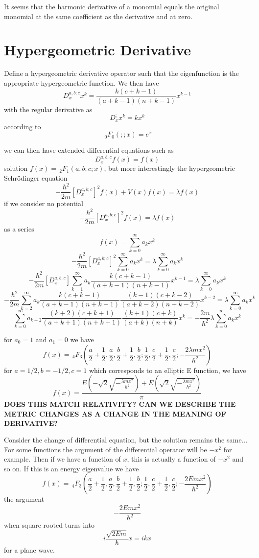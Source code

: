 \documentclass{article}
\begin{document}
It seems that the harmonic derivative of a monomial equals the original monomial at the same coefficient as the derivative and at zero.


\section{Hypergeometric Derivative}
Define a hypergeometric derivative operator such that the eigenfunction is the appropriate hypergeometric function. We then have 
$$
D^{a,b;c}_x x^k = \frac{k(c+k-1)}{(a+k-1)(n+k-1)}x^{k-1}
$$
with the regular derivative as 
$$
D^;_x x^k = k x^k
$$
according to 
$$
\;_0F_0(;;x) = e^x
$$

we can then have extended differential equations such as 
$$
D^{a,b;c}_x f(x) = f(x)
$$
solution $f(x) = \,_2F_1(a,b;c;x)$, but more interestingly the hypergeometric Schrödinger equation
$$
-\frac{\hbar^2}{2m} [D^{a,b;c}_x]^2 f(x) + V(x)f(x) = \lambda f(x)
$$
if we consider no potential
$$
-\frac{\hbar^2}{2m} [D^{a,b;c}_x]^2 f(x) = \lambda f(x)
$$
as a series 
$$
f(x) = \sum_{k=0}^\infty a_k x^k
$$
$$
-\frac{\hbar^2}{2m} [D^{a,b;c}_x]^2 \sum_{k=0}^\infty a_k x^k = \lambda \sum_{k=0}^\infty a_k x^k
$$
$$
-\frac{\hbar^2}{2m} [D^{a,b;c}_x]\sum_{k=1}^\infty a_k  \frac{k(c+k-1)}{(a+k-1)(n+k-1)} x^{k-1} = \lambda \sum_{k=0}^\infty a_k x^k
$$
$$
-\frac{\hbar^2}{2m}\sum_{k=2}^\infty a_k  \frac{k(c+k-1)}{(a+k-1)(n+k-1)} \frac{(k-1)(c+k-2)}{(a+k-2)(n+k-2)} x^{k-2} = \lambda \sum_{k=0}^\infty a_k x^k
$$
$$
\sum_{k=0}^\infty a_{k+2}  \frac{(k+2)(c+k+1)}{(a+k+1)(n+k+1)} \frac{(k+1)(c+k)}{(a+k)(n+k)} x^{k} = -\frac{2m}{\hbar^2}\lambda \sum_{k=0}^\infty a_k x^k
$$

for $a_0 = 1$ and $a_1 = 0$ we have 
$$
f(x) = \, _4F_3\left(\frac{a}{2}+\frac{1}{2},\frac{a}{2},\frac{b}{2}+\frac{1}{2},\frac{b}{2};\frac{1}{2},\frac{c}{2}+\frac{1}{2},\frac{c}{2};-\frac{2 \lambda  m x^2}{\hbar^2}\right)
$$
for $a=1/2,b=-1/2,c=1$ which corresponds to an elliptic E function, we have
$$
f(x) = \frac{E\left(-\sqrt{2} \sqrt{-\frac{\lambda  m x^2}{h^2}}\right)+E\left(\sqrt{2} \sqrt{-\frac{\lambda  m x^2}{h^2}}\right)}{\pi }
$$
\textbf{DOES THIS MATCH RELATIVITY? CAN WE DESCRIBE THE METRIC CHANGES AS A CHANGE IN THE MEANING OF DERIVATIVE?}

Consider the change of differential equation, but the solution remains the same... For some functions the argument of the differential operator will be $-x^2$ for example. Then if we have a function of $x$, this is actually a function of $-x^2$ and so on.  If this is an energy eigenvalue we have 
$$
f(x) = \, _4F_3\left(\frac{a}{2}+\frac{1}{2},\frac{a}{2},\frac{b}{2}+\frac{1}{2},\frac{b}{2};\frac{1}{2},\frac{c}{2}+\frac{1}{2},\frac{c}{2};-\frac{2 E  m x^2}{\hbar^2}\right)
$$
the argument 
$$
-\frac{2 E  m x^2}{\hbar^2}
$$
when square rooted turns into 
$$
i\frac{\sqrt{2 E  m}}{\hbar} x = i k x
$$
for a plane wave.
\end{document}
